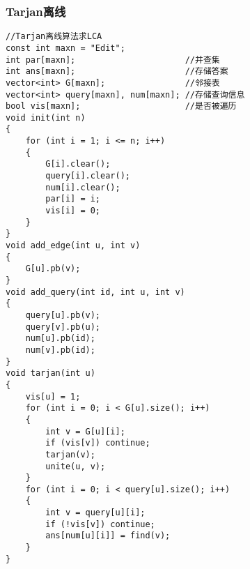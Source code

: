 \documentclass[a4]{article}
\begin{document}
\subsubsection{Tarjan离线}
\begin{lstlisting}
//Tarjan离线算法求LCA
const int maxn = "Edit";
int par[maxn];                      //并查集
int ans[maxn];                      //存储答案
vector<int> G[maxn];                //邻接表
vector<int> query[maxn], num[maxn]; //存储查询信息
bool vis[maxn];                     //是否被遍历
void init(int n)
{
    for (int i = 1; i <= n; i++)
    {
        G[i].clear();
        query[i].clear();
        num[i].clear();
        par[i] = i;
        vis[i] = 0;
    }
}
void add_edge(int u, int v)
{
    G[u].pb(v);
}
void add_query(int id, int u, int v)
{
    query[u].pb(v);
    query[v].pb(u);
    num[u].pb(id);
    num[v].pb(id);
}
void tarjan(int u)
{
    vis[u] = 1;
    for (int i = 0; i < G[u].size(); i++)
    {
        int v = G[u][i];
        if (vis[v]) continue;
        tarjan(v);
        unite(u, v);
    }
    for (int i = 0; i < query[u].size(); i++)
    {
        int v = query[u][i];
        if (!vis[v]) continue;
        ans[num[u][i]] = find(v);
    }
}
\end{lstlisting}
\end{document}
